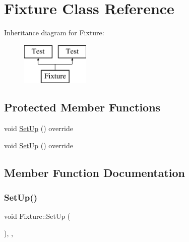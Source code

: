 \hypertarget{class_fixture}{}\section{Fixture Class Reference}
\label{class_fixture}
Inheritance diagram for Fixture\+:\begin{figure}[H]
\begin{center}
\leavevmode
\includegraphics[height=2.000000cm]{df/dda/class_fixture}
\end{center}
\end{figure}
\subsection*{Protected Member Functions}
\begin{DoxyCompactItemize}
\item 
void \mbox{\hyperlink{class_fixture_ad43066dc2f6aab4c4b4f0913e92f01f8}{Set\+Up}} () override
\item 
void \mbox{\hyperlink{class_fixture_ad43066dc2f6aab4c4b4f0913e92f01f8}{Set\+Up}} () override
\end{DoxyCompactItemize}


\subsection{Member Function Documentation}
\mbox{\label{class_fixture_ad43066dc2f6aab4c4b4f0913e92f01f8}} 
\subsubsection{\texorpdfstring{SetUp()}{SetUp()}\hspace{0.1cm}{\footnotesize\ttfamily [1/2]}}
{\footnotesize\ttfamily void Fixture\+::\+Set\+Up (\begin{DoxyParamCaption}{ }\end{DoxyParamCaption})\hspace{0.3cm}{\ttfamily [inline]}, {\ttfamily [override]}, {\ttfamily [protected]}}

\mbox{\label{class_fixture_ad43066dc2f6aab4c4b4f0913e92f01f8}} 
